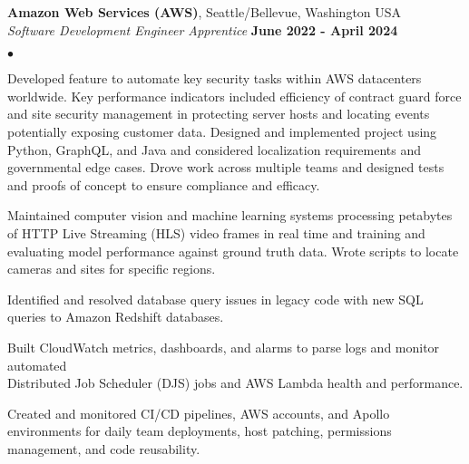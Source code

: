 \documentclass[margin,line]{res}
\newenvironment{list2}{
  \begin{list}{$\bullet$}{%
      \setlength{\itemsep}{0in}
      \setlength{\parsep}{0in} \setlength{\parskip}{0in}
      \setlength{\topsep}{0in} \setlength{\partopsep}{0in} 
      \setlength{\leftmargin}{0.2in}}}{\end{list}}
\begin{document}
\begin{resume}
{\bf Amazon Web Services (AWS)}, Seattle/Bellevue, Washington USA \\
{\em Software Development Engineer Apprentice} \hfill {\bf June 2022 - April 2024} \\
\begin{list2}
\item Developed feature to automate key security tasks within AWS datacenters worldwide. Key performance indicators included efficiency of contract guard force and site security management in protecting server hosts and locating events potentially exposing customer data. Designed and implemented project using Python, GraphQL, and Java and considered localization requirements and governmental edge cases. Drove work across multiple teams and designed tests and proofs of concept to ensure compliance and efficacy.
\item Maintained computer vision and machine learning systems processing petabytes of HTTP Live Streaming (HLS) video frames in real time and training and evaluating model performance against ground truth data. Wrote scripts to locate cameras and sites for specific regions.
\item Identified and resolved database query issues in legacy code with new SQL queries to Amazon Redshift databases.
\item Built CloudWatch metrics, dashboards, and alarms to parse logs and monitor automated \\ Distributed Job Scheduler (DJS) jobs and AWS Lambda health and performance.
\item Created and monitored CI/CD pipelines, AWS accounts, and Apollo environments for daily team deployments, host patching, permissions management, and code reusability.
\end{list2}


%
%

\end{resume}
\end{document}
